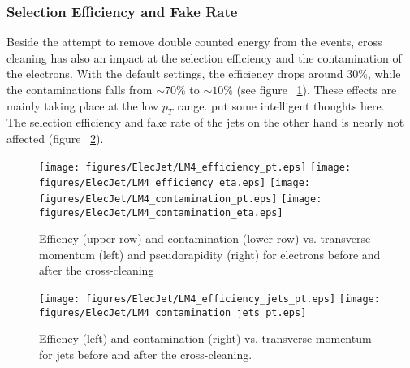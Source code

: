 \documentclass{cmspaper}
\begin{document}
\subsubsection{Selection Efficiency and Fake Rate}

Beside the attempt to remove double counted energy from the events, cross cleaning has also an impact at the selection efficiency and the contamination of the electrons. With the default settings, the efficiency drops around \(30 \%\), while the contaminations falls from \(\sim 70\%\) to \(\sim10\%\) (see figure ~\ref{fig:effCont_elec_ElecJet}). These effects are mainly taking place at the low \(p_T\) range. {\color{red}put some intelligent thoughts here.}\\
The selection efficiency and fake rate of the jets on the other hand is nearly not affected (figure ~\ref{fig:effCont_Jets_ElecJet}).
\begin{figure}[hb]
\begin{center}
    \texttt{[image: figures/ElecJet/LM4\_efficiency\_pt.eps]}
    \texttt{[image: figures/ElecJet/LM4\_efficiency\_eta.eps]}
    \texttt{[image: figures/ElecJet/LM4\_contamination\_pt.eps]}
    \texttt{[image: figures/ElecJet/LM4\_contamination\_eta.eps]}
    \caption{Effiency (upper row) and contamination (lower row) vs. transverse momentum (left) and pseudorapidity (right) for electrons before and after the cross-cleaning}
\label{fig:effCont_elec_ElecJet}
\end{center}
\end{figure}
\begin{figure}[hb]
\begin{center}
    \texttt{[image: figures/ElecJet/LM4\_efficiency\_jets\_pt.eps]}
    \texttt{[image: figures/ElecJet/LM4\_contamination\_jets\_pt.eps]}
    \caption{Effiency (left) and contamination (right) vs. transverse momentum for jets before
    and after the cross-cleaning.}
\label{fig:effCont_Jets_ElecJet}
\end{center}
\end{figure}
\end{document}
